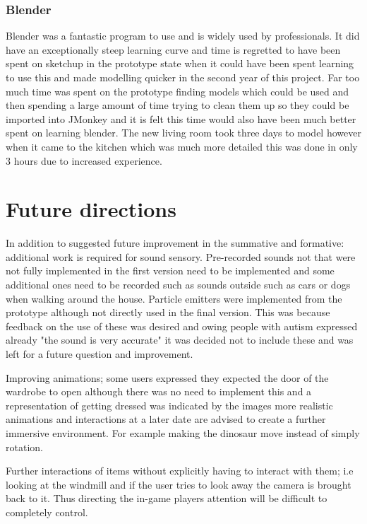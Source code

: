 \subsubsection{Blender}
Blender was a fantastic program to use and is widely used by professionals. It did have an exceptionally steep learning curve and time is regretted to have been spent on sketchup in the prototype state when it could have been spent learning to use this and made modelling quicker in the second year of this project. Far too much time was spent on the prototype finding models which could be used and then spending a large amount of time trying to clean them up so they could be imported into JMonkey and it is felt this time would also have been much better spent on learning blender. The new living room took three days to model however when it came to the kitchen which was much more detailed this was done in only 3 hours due to increased experience.

\section{Future directions}
In addition to suggested future improvement in the summative and formative: additional work is required for sound sensory. Pre-recorded sounds not that were not fully implemented in the first version need to be implemented and some additional ones need to be recorded such as sounds outside such as cars or dogs when walking around the house. Particle emitters were implemented from the prototype although not directly used in the final version. This was because feedback on the use of these was desired and owing people with autism expressed already "the sound is very accurate" it was decided not to include these and was left for a future question and improvement. 

Improving animations; some users expressed they expected the door of the wardrobe to open although there was no need to implement this and a representation of getting dressed was indicated by the images more realistic animations and interactions at a later date are advised to create a further immersive environment. For example making the dinosaur move instead of simply rotation. 

Further interactions of items without explicitly having to interact with them; i.e looking at the windmill and if the user tries to look away the camera is brought back to it. Thus directing the in-game players attention will be difficult to completely control.  

